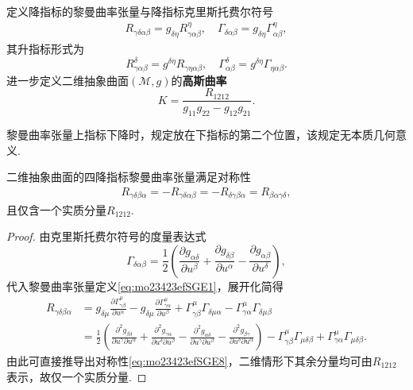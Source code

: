 \documentclass[../../main.tex]{subfiles}%
\begin{document}
\begin{definition}
定义降指标的黎曼曲率张量与降指标克里斯托费尔符号
\begin{align}
R_{\gamma\delta\alpha\beta}=g_{\delta\eta}R^\eta_{\gamma\alpha\beta},\quad \Gamma_{\delta\alpha\beta}=g_{\delta\eta}\Gamma^\eta_{\alpha\beta},
\label{eq:mo23423efSGE6}
\end{align}
其升指标形式为
$$R^\delta_{\gamma\alpha\beta}=g^{\delta\eta}R_{\gamma\eta\alpha\beta},\quad \Gamma^\delta_{\alpha\beta}=g^{\delta\eta}\Gamma_{\eta\alpha\beta}.$$
进一步定义二维抽象曲面$(\mathscr{M},g)$的\textbf{高斯曲率}
$$K=\frac{R_{1212}}{g_{11}g_{22}-g_{12}g_{21}}.$$
\end{definition}

\begin{remark}
黎曼曲率张量上指标下降时，规定放在下指标的第二个位置，该规定无本质几何意义.
\end{remark}

\begin{proposition}
二维抽象曲面的四降指标黎曼曲率张量满足对称性
\begin{align}
R_{\gamma\delta\beta\alpha}=-R_{\gamma\delta\alpha\beta}=-R_{\delta\gamma\beta\alpha}=R_{\beta\alpha\gamma\delta},
\label{eq:mo23423efSGE8}
\end{align}
且仅含一个实质分量$R_{1212}$.
\end{proposition}

\begin{proof}

由克里斯托费尔符号的度量表达式
$$\Gamma_{\delta\alpha\beta}=\frac12\left(\frac{\partial g_{\alpha\delta}}{\partial u^\beta}+\frac{\partial g_{\delta\beta}}{\partial u^\alpha}-\frac{\partial g_{\alpha\beta}}{\partial u^\delta}\right),$$
代入黎曼曲率张量定义\eqref{eq:mo23423efSGE1}，展开化简得
\begin{align}
R_{\gamma\delta\beta\alpha}&=g_{\delta\mu}\frac{\partial\Gamma^\mu_{\gamma\beta}}{\partial u^\alpha}-g_{\delta\mu}\frac{\partial\Gamma^\mu_{\gamma\alpha}}{\partial u^\beta}+\Gamma^\mu_{\gamma\beta}\Gamma_{\delta\mu\alpha}-\Gamma^\mu_{\gamma\alpha}\Gamma_{\delta\mu\beta}\nonumber\\
&=\frac12\left(\frac{\partial^2 g_{\beta\delta}}{\partial u^\gamma\partial u^\alpha}+\frac{\partial^2 g_{\gamma\alpha}}{\partial u^\delta\partial u^\beta}-\frac{\partial^2 g_{\alpha\delta}}{\partial u^\gamma\partial u^\beta}-\frac{\partial^2 g_{\beta\gamma}}{\partial u^\delta\partial u^\alpha}\right)-\Gamma^\mu_{\gamma\beta}\Gamma_{\mu\delta\beta}+\Gamma^\mu_{\gamma\alpha}\Gamma_{\mu\delta\beta}.
\label{eq:mo23423efSGE7}
\end{align}
由此可直接推导出对称性\eqref{eq:mo23423efSGE8}，二维情形下其余分量均可由$R_{1212}$表示，故仅一个实质分量.

\end{proof}
\end{document}
